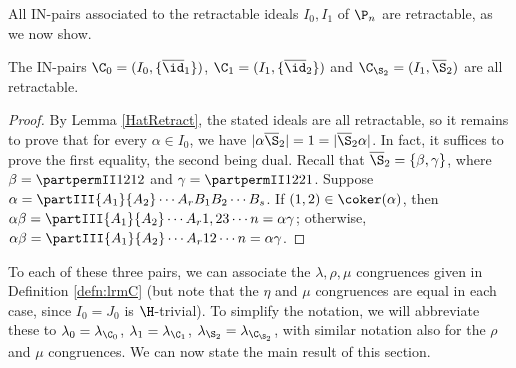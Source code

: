 %
%
%



All IN-pairs associated to the retractable ideals $I_0,I_1$ of $\P_n$ are retractable, as we now show.



\begin{lemma}
\label{ThreeTriples}
The IN-pairs $\C_0=(I_0,\{\overline{\id}_1\})$,
$\C_1=(I_1,\{\overline{\id}_2\})$ and
$\C_{\S_2}=(I_1,\overline{\S}_2)$ are all retractable.
\end{lemma}

\begin{proof}
By Lemma \ref{HatRetract}, the stated ideals are all retractable, so it remains to prove that for every $\alpha\in I_0$, we have
$|\alpha \overline{\S}_2|=1=|\overline{\S}_2\alpha|$.
In fact, it suffices to prove the first equality, the second being dual.
Recall that $\overline{\S}_2=\{\beta,\gamma\}$,
where $\beta=\partpermII1212$ and $\gamma=\partpermII1221$.
Suppose $\alpha=\partIII{A_1}{A_2}\cdots{A_r}{B_1}{B_2}\cdots{B_s}$.
If $(1,2)\in\coker(\alpha)$, then
$\alpha\beta=\partIII{A_1}{A_2}\cdots{A_r}{1,2}{3}\cdots{n}=\alpha\gamma$; otherwise,
$\alpha\beta=\partIII{A_1}{A_2}\cdots{A_r}{1}{2}\cdots{n}=\alpha\gamma$.
\end{proof}

To each of these three pairs, we can associate the $\lambda,\rho,\mu$ congruences given in Definition \ref{defn:lrmC} (but note that the $\eta$ and $\mu$ congruences are equal in each case, since $I_0=J_0$ is $\H$-trivial).
%
To simplify the notation, we will abbreviate these to $\lambda_0=\lambda_{\C_0}$, $\lambda_1=\lambda_{\C_1}$, $\lambda_{\S_2}=\lambda_{\C_{\S_2}}$, with similar notation also for the $\rho$ and $\mu$ congruences.
%
We can now state the main result of this section.


